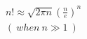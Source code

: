 \documentclass[preview]{standalone}
\begin{document}
\begin{align*}
n! \approx \sqrt{2\pi n}(\frac{n}{e})^n \\ ( \ when \ n \gg 1 \ )
\end{align*}
\end{document}
